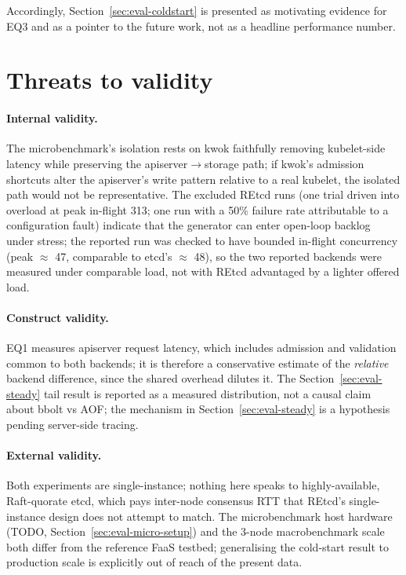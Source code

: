 Accordingly, Section~\ref{sec:eval-coldstart} is presented as motivating evidence for EQ3 and as a pointer to the future work, not as a headline performance number.

\section{Threats to validity}
\label{sec:eval-threats}

\paragraph{Internal validity.}
The microbenchmark's isolation rests on kwok faithfully removing kubelet-side latency while preserving the apiserver$\rightarrow$storage path; if kwok's admission shortcuts alter the apiserver's write pattern relative to a real kubelet, the isolated path would not be representative. The excluded REtcd runs (one trial driven into overload at peak in-flight 313; one run with a 50\% failure rate attributable to a configuration fault) indicate that the generator can enter open-loop backlog under stress; the reported run was checked to have bounded in-flight concurrency (peak $\approx$ 47, comparable to etcd's $\approx$ 48), so the two reported backends were measured under comparable load, not with REtcd advantaged by a lighter offered load.

\paragraph{Construct validity.}
EQ1 measures apiserver request latency, which includes admission and validation common to both backends; it is therefore a conservative estimate of the \emph{relative} backend difference, since the shared overhead dilutes it. The Section~\ref{sec:eval-steady} tail result is reported as a measured distribution, not a causal claim about bbolt vs AOF; the mechanism in Section~\ref{sec:eval-steady} is a hypothesis pending server-side tracing.

\paragraph{External validity.}
Both experiments are single-instance; nothing here speaks to highly-available, Raft-quorate etcd, which pays inter-node consensus RTT that REtcd's single-instance design does not attempt to match. The microbenchmark host hardware (TODO, Section~\ref{sec:eval-micro-setup}) and the 3-node macrobenchmark scale both differ from the reference FaaS testbed; generalising the cold-start result to production scale is explicitly out of reach of the present data.

